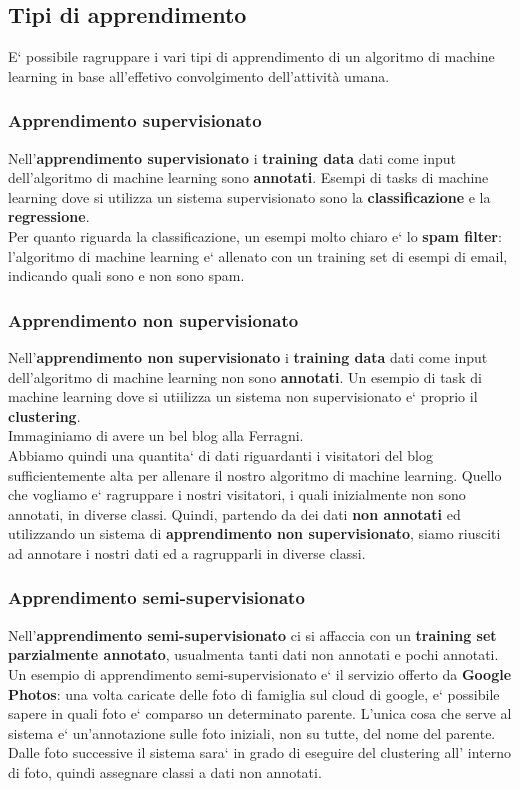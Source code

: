 \subsection{Tipi di apprendimento}
E` possibile ragruppare i vari tipi di apprendimento di un algoritmo di machine 
%
learning in base all'effetivo convolgimento dell'attività umana.
\subsubsection{Apprendimento supervisionato}
{
    Nell'\textbf{apprendimento supervisionato} i \textbf{training data} dati 
%
    come input dell'algoritmo di machine learning sono \textbf{annotati}.
}
Esempi di tasks di machine learning dove si utilizza un sistema supervisionato 
%
sono la \textbf{classificazione} e la \textbf{regressione}.
\\ 
Per quanto riguarda la classificazione, un esempi molto chiaro e` lo 
%
\textbf{spam filter}: l'algoritmo di machine learning e` allenato con un 
%
training set di esempi di email, indicando quali sono e non sono spam.
\subsubsection{Apprendimento non supervisionato}
{
    Nell'\textbf{apprendimento non supervisionato} i \textbf{training data} dati 
%
    come input dell'algoritmo di machine learning non sono \textbf{annotati}.
}
Un esempio di task di machine learning dove si utiilizza un sistema non 
%
supervisionato e` proprio il \textbf{clustering}.
%
\\
Immaginiamo di avere un bel blog alla Ferragni.
\\
Abbiamo quindi una quantita` di dati riguardanti i visitatori del blog
%
sufficientemente alta per allenare il nostro algoritmo di machine learning.
%
Quello che vogliamo e` ragruppare i nostri visitatori, i quali inizialmente non 
%
sono annotati, in diverse classi.
Quindi, partendo da dei dati \textbf{non annotati} ed utilizzando un sistema di 
%
\textbf{apprendimento non supervisionato}, siamo riusciti ad annotare i nostri 
%
dati ed a ragrupparli in diverse classi.
\subsubsection{Apprendimento semi-supervisionato}
{
    Nell'\textbf{apprendimento semi-supervisionato} ci si affaccia con un 
%
    \textbf{training set parzialmente annotato}, usualmenta tanti dati non 
%
    annotati e pochi annotati.
}
Un esempio di apprendimento semi-supervisionato e` il servizio offerto da 
%
\textbf{Google Photos}: una volta caricate delle foto di famiglia sul cloud di 
%
google, e` possibile sapere in quali foto e` comparso un determinato parente.
L'unica cosa che serve al sistema e` un'annotazione sulle foto iniziali, non su 
tutte, del nome del parente.
Dalle foto successive il sistema sara` in grado di eseguire del clustering all'
%
interno di foto, quindi assegnare classi a dati non annotati. 
